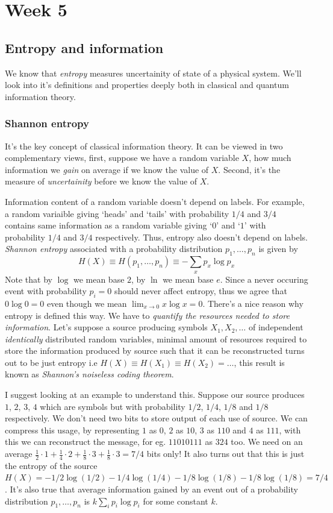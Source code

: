 \part{Week 5}
\chapter{Entropy and information}
We know that \textit{entropy} measures uncertainity of state of a physical system. We'll look into it's definitions and properties deeply both in classical and quantum information theory.

\section{Shannon entropy}
It's the key concept of classical information theory. It can be viewed in two complementary views, first, suppose we have a random variable $X$, how much information we \textit{gain} on average if we know the value of $X$. Second, it's the measure of \textit{uncertainity} before we know the value of $X$.

Information content of a random variable doesn't depend on labels. For example, a random variaible giving `heads' and `tails' with probability $1/4$ and $3/4$ contains same information as a random variable giving `$0$' and `$1$' with probability $1/4$ and $3/4$ respectively. Thus, entropy also doesn't depend on labels. \textit{Shannon entropy} associated with a probability distribution $p_1,\dots,p_n$ is given by
\begin{equation}
    H(X) \equiv H(p_1,\dots,p_n) \equiv -\sum_x p_x\log p_x
\end{equation}
Note that by $\log$ we mean base $2$, by $\ln$ we mean base $e$. Since a never occuring event with probability $p_i=0$ should never affect entropy, thus we agree that $0\log 0=0$ even though we mean $\lim_{x\rightarrow0} x\log x = 0$. There's a nice reason why entropy is defined this way. We have to \textit{quantify the resources needed to store information}. Let's suppose a source producing symbols $X_1,X_2,\dots$ of independent \textit{identically} distributed random variables, minimal amount of resources required to store the information produced by source such that it can be reconstructed turns out to be just entropy i.e $H(X)\equiv H(X_1) \equiv H(X_2) = \dots$, this result is known as \textit{Shannon's noiseless coding theorem}.

I suggest looking at an example to understand this. Suppose our source produces $1$, $2$, $3$, $4$ which are symbols but with probability $1/2$, $1/4$, $1/8$ and $1/8$ respectively. We don't need two bits to store output of each use of source. We can compress this usage, by representing $1$ as $0$, $2$ as $10$, $3$ as $110$ and $4$ as $111$, with this we can reconstruct the message, for eg. $11010111$ as $324$ too. We need on an average $\frac{1}{2}\cdot 1 + \frac{1}{4}\cdot 2 + \frac{1}{8}\cdot 3 + \frac{1}{8}\cdot 3 = 7/4$ bits only! It also turns out that this is just the entropy of the source $H(X) = -1/2\log(1/2) - 1/4\log(1/4) - 1/8\log(1/8) - 1/8\log(1/8) = 7/4$. It's also true that average information gained by an event out of a probability distribution $p_1,\dots,p_n$ is $k\sum_ip_i\log p_i$ for some constant $k$.


